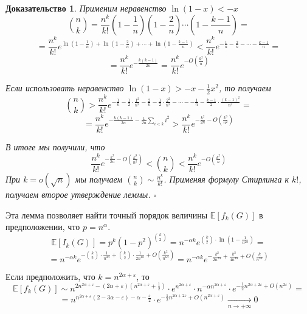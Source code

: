 \documentclass[a4paper]{article}
\newtheorem*{msolution}{Доказательство}
\begin{document}
\begin{msolution}
    Применим неравенство $\ln(1-x) < -x$ $$\binom{n}{k} = \frac{n^k}{k!}\left(1-\frac{1}{n}\right)
    \left(1-\frac{2}{n}\right)\cdots\left(1-\frac{k-1}{n}\right) = $$ $$ = \frac{n^k}{k!}e^{\ln\left(1-\frac{1}{n}\right) + 
    \ln\left(1-\frac{2}{n}\right) + \cdots + \ln\left(1-\frac{k-1}{n}\right)} < \frac{n^k}{k!}e^{-\frac{1}{n} -
    \frac{2}{n}-\cdots -\frac{k-1}{n}} = $$ $$ = \frac{n^k}{k!}e^{-\frac{k(k-1)}{2n}} = \frac{n^k}{k!}e^{-O\left(\frac{k^2}{n}\right)}$$
    
    Если использовать неравенство $\ln(1-x) > -x - \frac{1}{2}x^2$, то получаем $$\binom{n}{k} > 
    \frac{n^k}{k!}e^{-\frac{1}{n} - \frac{1}{2}\cdot\frac{1^2}{n^2} - \frac{2}{n} - \frac{1}{2}\cdot\frac{2^2}{n^2} - 
    \cdots - -\frac{1}{n} - \frac{k-1}{2}\cdot\frac{(k-1)^2}{n^2}} = $$ $$ = \frac{n^k}{k!}e^{-\frac{k(k-1)}{2n}-
    \frac{1}{2n}\sum\limits_{i<k}i^2}  > \frac{n^k}{k!}e^{-\frac{k^2}{2n}-O\left(\frac{k^3}{n^2}\right)}$$
    
    В итоге мы получили, что $$\frac{n^k}{k!}e^{-\frac{k^2}{2n}-O\left(\frac{k^3}{n^2}\right)} < \binom{n}{k} < 
    \frac{n^k}{k!}e^{-O\left(\frac{k^2}{n}\right)}$$ При $k = o(\sqrt{n})$ мы получаем $\binom{n}{k} \sim \frac{n^k}{k!}$.
    Применяя формулу Стирлинга к $k!$, получаем второе утверждение леммы. $\square$
\end{msolution}
    
	Эта лемма позволяет найти точный порядок величины $\mathbb{E}[f_k(G)]$ в предположении, что $p = n^\alpha$.
	$$\mathbb{E}[I_k(G)] = p^k(1-p^2)^{\binom{k}{2}} = n^{-\alpha k}e^{\binom{k}{2}\cdot\ln\left(1-\frac{1}{n^{2\alpha}}\right)} = $$
	$$ = n^{-\alpha k}e^{-\binom{k}{2}\cdot\frac{1}{n^{2\alpha}} + \binom{k}{2}\cdot\frac{1}{2n^{4\alpha}}+ 
	O\left(\frac{k^2}{n^{6\alpha}}\right)} = n^{-\alpha k}e^{-\frac{k^2}{2n^{2\alpha}} + \frac{k^2}{4n^{4\alpha}} + 
	O\left(\frac{k}{n^{2\alpha}}\right)}$$
	
	Если предположить, что $k = n^{2\alpha + \varepsilon}$, то $$\mathbb{E}[f_k(G)] \sim n^{2n^{2\alpha + \varepsilon} -
	(2\alpha + \varepsilon)(n^{2\alpha + \varepsilon} + \frac{1}{2})}\cdot e^{n^{2\alpha + \varepsilon}}\cdot 
	n^{-\alpha n^{2\alpha+\varepsilon}}\cdot e^{-\frac{1}{2}n^{2\alpha + 2\varepsilon} + O\left(n^{2\varepsilon}\right)} = $$
	$$ = n^{n^{2\alpha + \varepsilon}(2 - 3\alpha - \varepsilon) - \alpha - \frac{\varepsilon}{2}}\cdot 
	e^{-\frac{1}{2}n^{2\alpha + 2\varepsilon} + O\left(n^{2\alpha + \varepsilon}\right)}\xrightarrow[n \to +\infty]{} 0$$
	
\end{document}
